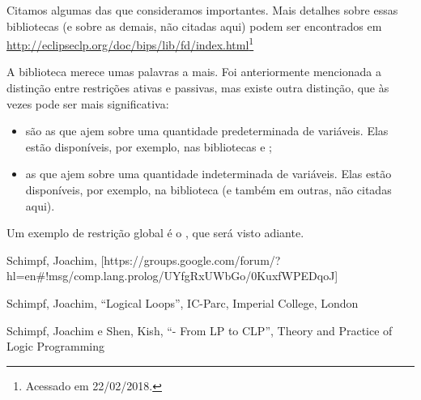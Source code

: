 Citamos algumas das que consideramos importantes. Mais detalhes sobre essas bibliotecas (e sobre as
demais, não citadas aqui) podem ser encontrados em
\url{http://eclipseclp.org/doc/bips/lib/fd/index.html}\footnote{Acessado em 22/02/2018.}

A biblioteca  merece umas palavras a mais. Foi anteriormente mencionada a
distinção entre restrições ativas e passivas, mas existe outra distinção, que às vezes pode ser mais
significativa:

\begin{itemize}
  \item {} são as que ajem sobre uma quantidade predeterminada de
    variáveis. Elas estão disponíveis, por exemplo, nas bibliotecas  e
    ;
  \item {} as que ajem sobre uma quantidade indeterminada de variáveis. Elas estão disponíveis, por
    exemplo, na biblioteca  (e também em outras, não citadas aqui).
\end{itemize}

Um exemplo de restrição global é o , que será visto adiante.

  \begin{thebibliography}{1}

      Schimpf, Joachim,
      [https://groups.google.com/forum/?hl=en#!msg/comp.lang.prolog/UYfgRxUWbGo/0KuxfWPEDqoJ]

        Schimpf, Joachim,
        ``Logical Loops'', IC-Parc, Imperial College, London

        Schimpf, Joachim e Shen, Kish,
        ``\eclipse - From LP to CLP'',
        Theory and Practice of Logic Programming


  \end{thebibliography}




%
